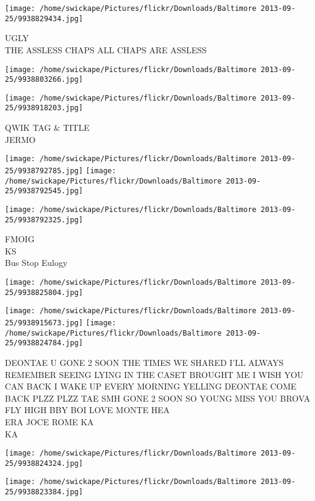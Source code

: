 \documentclass[10pt,letterpaper]{article}
\begin{document}
\vspace{0.25in}
\texttt{[image: /home/swickape/Pictures/flickr/Downloads/Baltimore 2013-09-25/9938829434.jpg]}

UGLY\\
THE ASSLESS CHAPS ALL CHAPS ARE ASSLESS
\pagebreak

\texttt{[image: /home/swickape/Pictures/flickr/Downloads/Baltimore 2013-09-25/9938803266.jpg]}

\vspace{0.25in}
\texttt{[image: /home/swickape/Pictures/flickr/Downloads/Baltimore 2013-09-25/9938918203.jpg]}

QWIK TAG \& TITLE\\
JERMO
\pagebreak

\texttt{[image: /home/swickape/Pictures/flickr/Downloads/Baltimore 2013-09-25/9938792785.jpg]}
\texttt{[image: /home/swickape/Pictures/flickr/Downloads/Baltimore 2013-09-25/9938792545.jpg]}

\texttt{[image: /home/swickape/Pictures/flickr/Downloads/Baltimore 2013-09-25/9938792325.jpg]}

FMOIG\\
KS\\
Bus Stop Eulogy
\pagebreak

\texttt{[image: /home/swickape/Pictures/flickr/Downloads/Baltimore 2013-09-25/9938825804.jpg]}

\vspace{0.25in}
\texttt{[image: /home/swickape/Pictures/flickr/Downloads/Baltimore 2013-09-25/9938915673.jpg]}
\texttt{[image: /home/swickape/Pictures/flickr/Downloads/Baltimore 2013-09-25/9938824784.jpg]}

DEONTAE U GONE 2 SOON THE TIMES WE SHARED I'LL ALWAYS REMEMBER SEEING LYING IN THE CASET BROUGHT ME I WISH YOU CAN BACK I WAKE UP EVERY MORNING YELLING DEONTAE COME BACK PLZZ PLZZ TAE SMH GONE 2 SOON SO YOUNG MISS YOU BROVA FLY HIGH BBY BOI LOVE MONTE HEA\\
ERA JOCE ROME KA\\
KA
\pagebreak

\texttt{[image: /home/swickape/Pictures/flickr/Downloads/Baltimore 2013-09-25/9938824324.jpg]}

\vspace{0.25in}
\texttt{[image: /home/swickape/Pictures/flickr/Downloads/Baltimore 2013-09-25/9938823384.jpg]}
\end{document}
